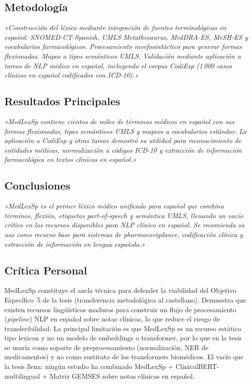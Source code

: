 \documentclass[11pt,a4paper]{article}
\newcommand{\cita}[1]{{\color{navy}\textit{«#1»}}}
\begin{document}
\subsection{Metodología}
\cita{Construcción del léxico mediante integración de fuentes terminológicas en español: SNOMED-CT-Spanish, UMLS Metathesaurus, MedDRA-ES, MeSH-ES y vocabularios farmacológicos. Procesamiento morfosintáctico para generar formas flexionadas. Mapeo a tipos semánticos UMLS. Validación mediante aplicación a tareas de NLP médico en español, incluyendo el corpus CodiEsp (1\,000 casos clínicos en español codificados con ICD-10).}

\subsection{Resultados Principales}
\cita{MedLexSp contiene cientos de miles de términos médicos en español con sus formas flexionadas, tipos semánticos UMLS y mapeos a vocabularios estándar. La aplicación a CodiEsp y otras tareas demostró su utilidad para reconocimiento de entidades médicas, normalización a códigos ICD-10 y extracción de información farmacológica en textos clínicos en español.}

\subsection{Conclusiones}
\cita{MedLexSp es el primer léxico médico unificado para español que combina términos, flexión, etiquetas part-of-speech y semántica UMLS, llenando un vacío crítico en los recursos disponibles para NLP clínico en español. Se recomienda su uso como recurso base para sistemas de pharmacovigilance, codificación clínica y extracción de información en lengua española.}

\subsection{Crítica Personal}
MedLexSp constituye el ancla técnica para defender la viabilidad del Objetivo Específico~5 de la tesis (transferencia metodológica al castellano). Demuestra que existen recursos lingüísticos maduros para construir un flujo de procesamiento (\textit{pipeline}) NLP en español sobre notas clínicas, lo que reduce el riesgo de transferibilidad. La principal limitación es que MedLexSp es un recurso estático tipo lexicon y no un modelo de embeddings o transformer, por lo que en la tesis se usaría como soporte de preprocesamiento (normalización, NER de medicamentos) y no como sustituto de los transformers biomédicos. El vacío que la tesis llena: ningún estudio ha combinado MedLexSp + ClinicalBERT-multilingual + Matriz GEMSES sobre notas clínicas en español.
\end{document}
